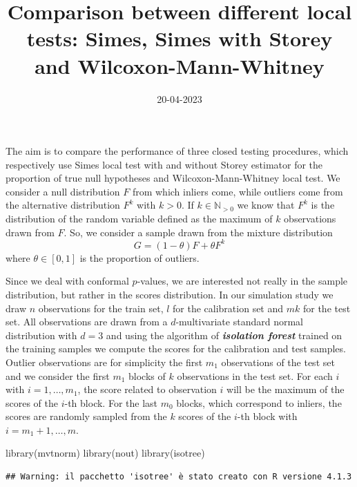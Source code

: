 \documentclass[
]{article}
\title{Comparison between different local tests: Simes, Simes with
Storey and Wilcoxon-Mann-Whitney}
\author{}
\date{\vspace{-2.5em}20-04-2023}
\newenvironment{Shaded}{\begin{snugshade}}{\end{snugshade}}
\newcommand{\FunctionTok}[1]{\textcolor[rgb]{0.00,0.00,0.00}{#1}}
\newcommand{\NormalTok}[1]{#1}
\begin{document}
\maketitle

The aim is to compare the performance of three closed testing
procedures, which respectively use Simes local test with and without
Storey estimator for the proportion of true null hypotheses and
Wilcoxon-Mann-Whitney local test. We consider a null distribution \(F\)
from which inliers come, while outliers come from the alternative
distribution \(F^k\) with \(k>0\). If \(k\in\mathbb{N}_{>0}\) we know
that \(F^k\) is the distribution of the random variable defined as the
maximum of \(k\) observations drawn from \(F\). So, we consider a sample
drawn from the mixture distribution \[G = (1-\theta) F+\theta F^k\]
where \(\theta\in[0,1]\) is the proportion of outliers.

Since we deal with conformal \(p\)-values, we are interested not really
in the sample distribution, but rather in the scores distribution. In
our simulation study we draw \(n\) observations for the train set, \(l\)
for the calibration set and \(mk\) for the test set. All observations
are drawn from a \(d\)-multivariate standard normal distribution with
\(d=3\) and using the algorithm of \textbf{\emph{isolation forest}}
trained on the training samples we compute the scores for the
calibration and test samples. Outlier observations are for simplicity
the first \(m_1\) observations of the test set and we consider the first
\(m_1\) blocks of \(k\) observations in the test set. For each \(i\)
with \(i=1,\ldots,m_1\), the score related to observation \(i\) will be
the maximum of the scores of the \(i\)-th block. For the last \(m_0\)
blocks, which correspond to inliers, the scores are randomly sampled
from the \(k\) scores of the \(i\)-th block with \(i=m_1+1,\ldots,m\).

\begin{Shaded}
\begin{Highlighting}[]
\FunctionTok{library}\NormalTok{(mvtnorm)}
\FunctionTok{library}\NormalTok{(nout)}
\FunctionTok{library}\NormalTok{(isotree)}
\end{Highlighting}
\end{Shaded}

\begin{verbatim}
## Warning: il pacchetto 'isotree' è stato creato con R versione 4.1.3
\end{verbatim}
\end{document}
